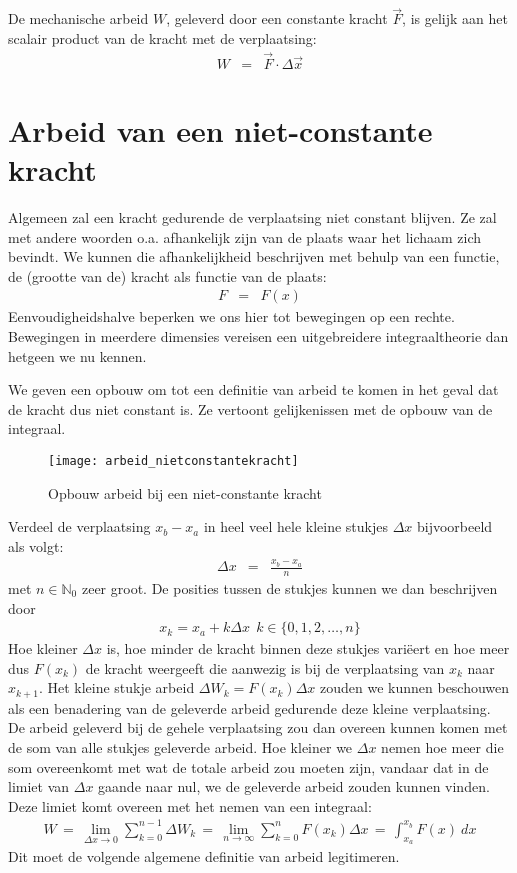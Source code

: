 De mechanische arbeid $W$, geleverd door een constante kracht $\vec{F}$, is gelijk aan het scalair product van de kracht met de verplaatsing:
\begin{eqnarray}
W&=&\vec{F}\cdot\Delta\vec{x}\label{def_arbeid_cste_kracht}
\end{eqnarray}

\section{Arbeid van een niet-constante kracht}

Algemeen zal een kracht gedurende de verplaatsing niet constant blijven. Ze zal met andere woorden o.a. afhankelijk zijn van de plaats waar het lichaam zich bevindt. We kunnen die afhankelijkheid beschrijven met behulp van een functie, de (grootte van de) kracht
als functie van de plaats:
\begin{eqnarray*}
F&=&F(x)
\end{eqnarray*}
Eenvoudigheidshalve beperken we ons hier tot bewegingen op een rechte. Bewegingen in meerdere dimensies vereisen een uitgebreidere integraaltheorie dan hetgeen we nu kennen.

We geven een opbouw om tot een definitie van arbeid te komen in het geval dat de kracht dus niet constant is. Ze vertoont gelijkenissen met de opbouw van de integraal.
\begin{figure}[h]
\centering
\texttt{[image: arbeid\_nietconstantekracht]}
\caption{Opbouw arbeid bij een niet-constante kracht}
\end{figure}

Verdeel de verplaatsing $x_b-x_a$ in heel veel hele kleine stukjes $\Delta x$ bijvoorbeeld als volgt:
\begin{eqnarray*}
\Delta x&=&\frac{x_b-x_a}{n}
\end{eqnarray*}
met $n\in\mathbb{N}_0$ zeer groot. De posities tussen de stukjes kunnen we dan be\-schrij\-ven door
\begin{eqnarray*}
x_k=x_a+k\Delta x\ \ k\in\{0,1,2,\ldots,n\}
\end{eqnarray*}
Hoe kleiner $\Delta x$ is, hoe minder de kracht binnen deze stukjes vari\"eert en hoe meer dus $F(x_k)$ de kracht weergeeft die aanwezig is bij de verplaatsing van $x_{k}$ naar $x_{k+1}$. Het kleine stukje arbeid $\Delta W_k=F(x_k)\Delta x$ zouden we kunnen beschouwen als
een benadering van de geleverde arbeid gedurende deze kleine verplaatsing. De arbeid geleverd bij de gehele verplaatsing zou dan overeen kunnen komen met de som van alle stukjes geleverde arbeid. Hoe kleiner we $\Delta x$ nemen hoe meer die som overeenkomt met wat de totale arbeid zou moeten zijn, vandaar dat in de limiet van $\Delta x$ gaande naar nul, we de geleverde arbeid zouden kunnen vinden. Deze limiet komt overeen met het nemen van een integraal:
\begin{eqnarray*}
W\,=\,\lim_{\Delta x\rightarrow0}\sum_{k=0}^{n-1}\Delta W_k
\,=\,\lim_{n\rightarrow\infty}\sum_{k=0}^{n}F(x_k)\Delta x
\,=\,\int_{x_a}^{x_b}F(x)~dx
\end{eqnarray*}
Dit moet de volgende algemene definitie van arbeid legitimeren.

